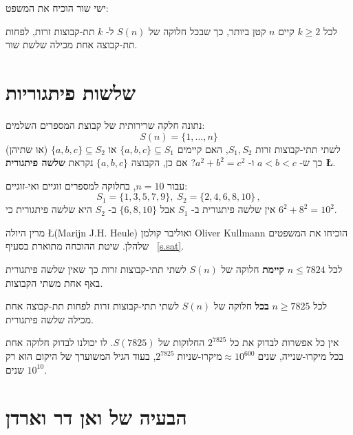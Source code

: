ישי שור
הוכיח את המשפט:
\begin{theorem}[\L{Schur}]
לכל 
$k\geq 2$
קיים 
$n$
קטן ביותר, כך שבכל חלוקה של
$S(n)$
ל-%
$k$
תת-קבוצות זרות, לפחות תת-קבוצה אחת מכילה שלשת שור.
\end{theorem}


\section{שלשות פיתגוריות}\label{s.pyth}

\begin{definition}
נתונה חלקה שרירותית של קבוצת המספרים השלמים:
\[
S(n)=\{1,\ldots,n\}
\]
לשתי תתי-קבוצות זרות
$S_1,S_2$,
האם קיימים
$\{a,b,c\}\subseteq S_1$
או
$\{a,b,c\}\subseteq S_2$
(או שתיהן) כך ש-%
$a\!<\!b\!<\!c$
ו-%
$a^2+b^2=c^2$?
אם כן, הקבוצה 
$\{a,b,c\}$
נקראת 
\textbf{שלשה פיתגורית \L{}}.
\end{definition}

\begin{example}
עבור
$n=10$,
בחלוקה למספרים זוגיים ואי-זוגיים:
\[
S_1 = \{1,3,5,7,9\},\; S_2=\{2,4,6,8,10\}\,,
\]
אין שלשה פיתגורית
ב-%
$S_1$
אבל  
$\{6,8,10\}$
ב-%
$S_2$
היא
שלשה פיתגורית 
כי
$6^2+8^2=10^2$.
\end{example}

מרין היולה 
\L{(Marijn J.H. Heule)}
ואוליבר קולמן 
Oliver Kullmann
הוכיחו את המשפטים שלהלן. שיטת ההוכחה מתוארת בסעיף%
~\ref{s.sat}.

\begin{theorem}
לכל 
$n\leq 7824$
\textbf{קיימת}
חלוקה של 
$S(n)$
לשתי תתי-קבוצות זרות כך שאין שלשה פיתגורית
באף אחת משתי הקבוצות.
\end{theorem}

\begin{theorem}
לכל 
$n\geq 7825$
\textbf{בכל}
חלוקה של 
$S(n)$
לשתי תתי-קבוצות זרות לפחות תת-קבוצה אחת מכילה שלשה פיתגורית.
\end{theorem}
אין כל אפשרות לבדוק את כל
$2^{7825}$
החלוקות של
$S(7825)$.
לו יכולנו לבדוק חלוקה אחת בכל מיקרו-שנייה, 
$2^{7825}\; \textrm{מיקרו-שניות}\approx 10^{600}\; \textrm{שנים}$, 
בעוד הגיל המשוערך של היקום הוא רק
$10^{10}$
שנים.


\section{הבעיה של ואן דר וארדן}\label{s.van}

